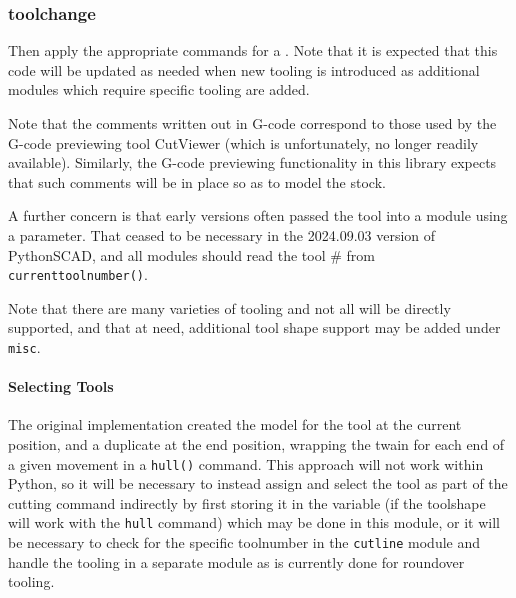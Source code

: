 \documentclass{ltxdoc}
\begin{document}
\subsubsection{toolchange}

Then apply the appropriate commands for a \label{subsubsec:toolchange} . Note that it is expected that this code will be updated as needed when new tooling is introduced as additional modules which require specific tooling are added. 

Note that the comments written out in G-code correspond to those used by the G-code previewing tool CutViewer (which is unfortunately, no longer readily available). Similarly, the G-code previewing functionality in this library expects that such comments will be in place so as to model the stock.

A further concern is that early versions often passed the tool into a module using a parameter. That ceased to be necessary in the 2024.09.03 version of PythonSCAD, and all modules should read the tool \# from \verb|currenttoolnumber()|. %


Note that there are many varieties of tooling and not all will be directly supported, and that at need, additional tool shape support may be added under \verb|misc|.
 
\paragraph{Selecting Tools}
 
The original implementation created the model for the tool at the current position, and a duplicate at the end position, wrapping the twain for each end of a given movement in a \verb|hull()| command. This approach will not work within Python, so it will be necessary to instead assign and select the tool as part of the cutting command indirectly by first storing it in the variable  (if the toolshape will work with the \verb|hull| command) which may be done in this module, or it will be necessary to check for the specific toolnumber in the \verb|cutline| module and handle the tooling in a separate module as is currently done for roundover tooling.
\end{document}
